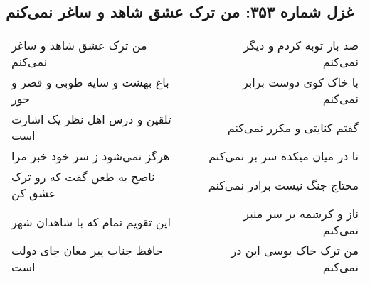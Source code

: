 \begin{center}
\section*{غزل شماره ۳۵۳: من ترک عشق شاهد و ساغر نمی‌کنم}
\label{sec:sh353}
\begin{longtable}{l p{0.5cm} r}
من ترک عشق شاهد و ساغر نمی‌کنم
&&
صد بار توبه کردم و دیگر نمی‌کنم
\\
باغ بهشت و سایه طوبی و قصر و حور
&&
با خاک کوی دوست برابر نمی‌کنم
\\
تلقین و درس اهل نظر یک اشارت است
&&
گفتم کنایتی و مکرر نمی‌کنم
\\
هرگز نمی‌شود ز سر خود خبر مرا
&&
تا در میان میکده سر بر نمی‌کنم
\\
ناصح به طعن گفت که رو ترک عشق کن
&&
محتاج جنگ نیست برادر نمی‌کنم
\\
این تقویم تمام که با شاهدان شهر
&&
ناز و کرشمه بر سر منبر نمی‌کنم
\\
حافظ جناب پیر مغان جای دولت است
&&
من ترک خاک بوسی این در نمی‌کنم
\\
\end{longtable}
\end{center}
